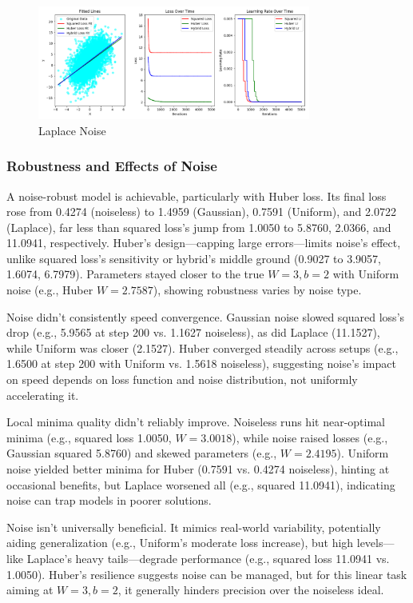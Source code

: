 \documentclass{article}
\begin{document}
\begin{figure}[H]
    \centering
    \includegraphics[width=0.8\textwidth]{assets/laplace_noise.png}
    \caption{Laplace Noise}
    \label{fig:laplace_noise_curve}
\end{figure}

\subsubsection{Robustness and Effects of Noise}

A noise-robust model is achievable, particularly with Huber loss. Its final loss rose from 0.4274 (noiseless) to 1.4959 (Gaussian), 0.7591 (Uniform), and 2.0722 (Laplace), far less than squared loss’s jump from 1.0050 to 5.8760, 2.0366, and 11.0941, respectively. Huber’s design—capping large errors—limits noise’s effect, unlike squared loss’s sensitivity or hybrid’s middle ground (0.9027 to 3.9057, 1.6074, 6.7979). Parameters stayed closer to the true \( W = 3, b = 2 \) with Uniform noise (e.g., Huber \( W = 2.7587 \)), showing robustness varies by noise type.

Noise didn’t consistently speed convergence. Gaussian noise slowed squared loss’s drop (e.g., 5.9565 at step 200 vs. 1.1627 noiseless), as did Laplace (11.1527), while Uniform was closer (2.1527). Huber converged steadily across setups (e.g., 1.6500 at step 200 with Uniform vs. 1.5618 noiseless), suggesting noise’s impact on speed depends on loss function and noise distribution, not uniformly accelerating it.

Local minima quality didn’t reliably improve. Noiseless runs hit near-optimal minima (e.g., squared loss 1.0050, \( W = 3.0018 \)), while noise raised losses (e.g., Gaussian squared 5.8760) and skewed parameters (e.g., \( W = 2.4195 \)). Uniform noise yielded better minima for Huber (0.7591 vs. 0.4274 noiseless), hinting at occasional benefits, but Laplace worsened all (e.g., squared 11.0941), indicating noise can trap models in poorer solutions.

Noise isn’t universally beneficial. It mimics real-world variability, potentially aiding generalization (e.g., Uniform’s moderate loss increase), but high levels—like Laplace’s heavy tails—degrade performance (e.g., squared loss 11.0941 vs. 1.0050). Huber’s resilience suggests noise can be managed, but for this linear task aiming at \( W = 3, b = 2 \), it generally hinders precision over the noiseless ideal.
\end{document}
